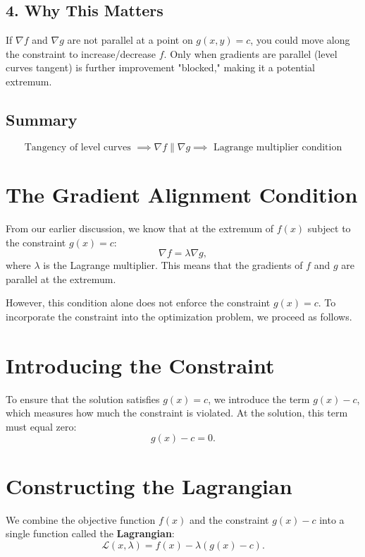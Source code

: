 \documentclass{article}
\begin{document}
\subsection*{4. Why This Matters}
If \( \nabla f \) and \( \nabla g \) are not parallel at a point on \( g(x, y) = c \), you could move along the constraint to increase/decrease \( f \). Only when gradients are parallel (level curves tangent) is further improvement "blocked," making it a potential extremum.


\subsection*{Summary}
\[
\boxed{
\text{Tangency of level curves } \implies \nabla f \parallel \nabla g \implies \text{ Lagrange multiplier condition}
}
\]



\section*{The Gradient Alignment Condition}

From our earlier discussion, we know that at the extremum of $ f(x) $ subject to the constraint $ g(x) = c $:
\[
\nabla f = \lambda \nabla g,
\]
where $ \lambda $ is the Lagrange multiplier. This means that the gradients of $ f $ and $ g $ are parallel at the extremum.

However, this condition alone does not enforce the constraint $ g(x) = c $. To incorporate the constraint into the optimization problem, we proceed as follows.

\section*{Introducing the Constraint}

To ensure that the solution satisfies $ g(x) = c $, we introduce the term $ g(x) - c $, which measures how much the constraint is violated. At the solution, this term must equal zero:
\[
g(x) - c = 0.
\]

\section*{Constructing the Lagrangian}

We combine the objective function $ f(x) $ and the constraint $ g(x) - c $ into a single function called the \textbf{Lagrangian}:
\[
\mathcal{L}(x, \lambda) = f(x) - \lambda (g(x) - c).
\]
\end{document}
